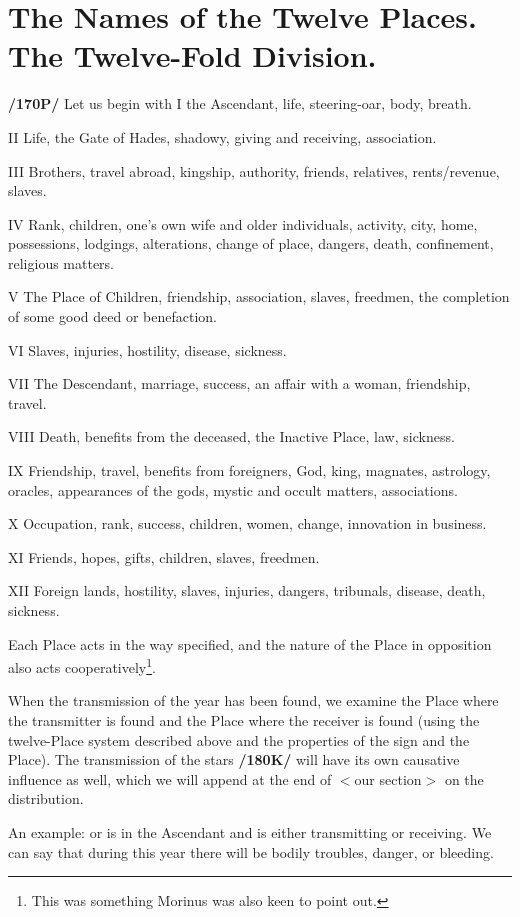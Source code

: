 \section{The Names of the Twelve Places. The Twelve-Fold Division.}
\textbf{/170P/} Let us begin with I the Ascendant, life, steering-oar, body, breath. 

II Life, the Gate of Hades, shadowy, giving and receiving, association.

III Brothers, travel abroad, kingship, authority, friends, relatives, rents/revenue, slaves.

IV Rank, children, one’s own wife and older individuals, activity, city, home, possessions, lodgings, alterations, change of place, dangers, death, confinement, religious matters.

V The Place of Children, friendship, association, slaves, freedmen, the completion of some good deed or benefaction.

VI Slaves, injuries, hostility, disease, sickness.

VII The Descendant, marriage, success, an affair with a woman, friendship, travel.

VIII Death, benefits from the deceased, the Inactive Place, law, sickness.

IX Friendship, travel, benefits from foreigners, God, king, magnates, astrology, oracles, appearances of the gods, mystic and occult matters, associations.

X Occupation, rank, success, children, women, change, innovation in business.

XI Friends, hopes, gifts, children, slaves, freedmen.

XII Foreign lands, hostility, slaves, injuries, dangers, tribunals, disease, death, sickness.

Each Place acts in the way specified, and the nature of the Place in opposition also acts cooperatively\footnote{This was something Morinus was also keen to point out.}.

When the transmission of the year has been found, we examine the Place where the transmitter is found and the Place where the receiver is found (using the twelve-Place system described above and the properties of the sign and the Place). The transmission of the stars \textbf{/180K/} will have its own causative influence as well, which we will append at the end of $<$our section$>$ on the distribution.

An example: \Saturn\xspace or \Mars\xspace is in the Ascendant and is either transmitting or receiving. We can say that during this year there will be bodily troubles, danger, or bleeding. 

